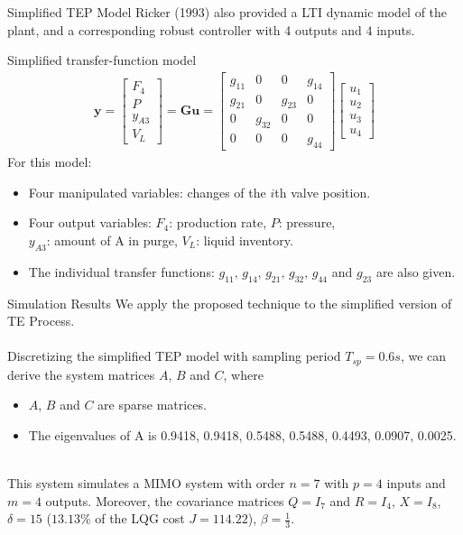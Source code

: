 \documentclass[10pt]{beamer}
\begin{document}
\begin{frame}{Simplified TEP Model}
  Ricker (1993) also provided a LTI dynamic model of the plant, and a corresponding robust controller with 4 outputs and 4 inputs.
  \begin{block}{Simplified transfer-function model}
    \begin{align*}
      \textbf{y}= \begin{bmatrix}
        F_4\\ 
        P\\ 
        y_{A3}\\
        V_L 
      \end{bmatrix}=\textbf{G}\textbf{u}=\begin{bmatrix}
        g_{11} & 0 & 0 & g_{14}\\ 
        g_{21} & 0 & g_{23} & 0\\ 
        0 & g_{32} & 0 & 0\\ 
        0 & 0 & 0 & g_{44} 
      \end{bmatrix}\begin{bmatrix}
        u_1\\ 
        u_2\\ 
        u_3\\ 
        u_4
      \end{bmatrix}
    \end{align*}
    For this model:\\
    \begin{itemize}
    \item Four manipulated variables: changes of the $i$th valve position.
    \item Four output variables: $F_4$: production rate, $P$: pressure,\\ $y_{A3}$: amount of A in purge, $V_L$: liquid inventory. 
    \item The individual transfer functions: $g_{11},\, g_{14},\, g_{21},\, g_{32},\, g_{44}$ and $g_{23}$ are also given. 
    \end{itemize}
  \end{block}
\end{frame}

\begin{frame}{Simulation Results}
  We apply the proposed technique to the simplified version of TE Process. \\~\\

  Discretizing the simplified TEP model with sampling period $T_{sp} = 0.6s$, we can derive the system matrices $A$, $B$ and $C$, where  
  \begin{itemize}
  \item $A$, $B$ and $C$ are sparse matrices.
  \item The eigenvalues of A is 0.9418,  0.9418, 0.5488, 0.5488, 0.4493, 0.0907, 0.0025. 
  \end{itemize}
  ~\\
  This system simulates a MIMO system with order $n = 7$ with  $p = 4$ inputs and $m = 4$ outputs. Moreover, the covariance matrices $Q = I_{7}$ and $ R = I_{4}$, $X = I_{8}$,  $\delta = 15$ ($13.13\%$ of the LQG cost $J = 114.22$), $\beta = \frac{1}{3}$.
\end{frame}
\end{document}
